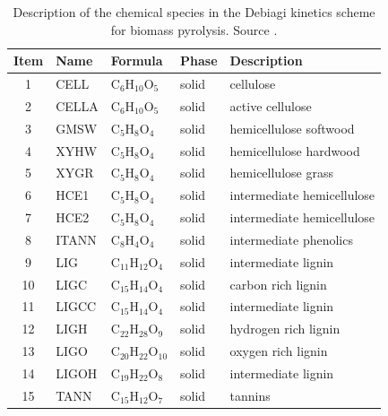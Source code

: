 \documentclass[12pt,titlepage]{article}
\begin{document}
\begin{center}
\footnotesize
\begin{longtable}{cllll}
    \caption{Description of the chemical species in the Debiagi kinetics scheme for biomass pyrolysis. Source \cite{Debiagi-2018}.}
    \label{tab:chem-species} \\
    \toprule
    Item & Name & Formula & Phase & Description \\
    \midrule
    1  & CELL           & C$_6$H$_{10}$O$_5$      & \cellcolor{green!25}solid        & cellulose \\
    2  & CELLA          & C$_6$H$_{10}$O$_5$      & \cellcolor{green!25}solid        & active cellulose \\
    3  & GMSW           & C$_5$H$_{8}$O$_4$       & \cellcolor{green!25}solid        & hemicellulose softwood \\
    4  & XYHW           & C$_5$H$_{8}$O$_4$       & \cellcolor{green!25}solid        & hemicellulose hardwood \\
    5  & XYGR           & C$_5$H$_{8}$O$_4$       & \cellcolor{green!25}solid        & hemicellulose grass \\
    6  & HCE1           & C$_5$H$_{8}$O$_4$       & \cellcolor{green!25}solid        & intermediate hemicellulose \\
    7  & HCE2           & C$_5$H$_{8}$O$_4$       & \cellcolor{green!25}solid        & intermediate hemicellulose \\
    8  & ITANN          & C$_8$H$_{4}$O$_4$       & \cellcolor{green!25}solid        & intermediate phenolics \\
    9  & LIG            & C$_{11}$H$_{12}$O$_4$   & \cellcolor{green!25}solid        & intermediate lignin \\
    10 & LIGC           & C$_{15}$H$_{14}$O$_4$   & \cellcolor{green!25}solid        & carbon rich lignin \\
    11 & LIGCC          & C$_{15}$H$_{14}$O$_4$   & \cellcolor{green!25}solid        & intermediate lignin \\
    12 & LIGH           & C$_{22}$H$_{28}$O$_9$   & \cellcolor{green!25}solid        & hydrogen rich lignin \\
    13 & LIGO           & C$_{20}$H$_{22}$O$_{10}$& \cellcolor{green!25}solid        & oxygen rich lignin \\
    14 & LIGOH          & C$_{19}$H$_{22}$O$_8$   & \cellcolor{green!25}solid        & intermediate lignin \\
    15 & TANN           & C$_{15}$H$_{12}$O$_7$   & \cellcolor{green!25}solid        & tannins \\

\end{longtable}
\end{center}
\end{document}
